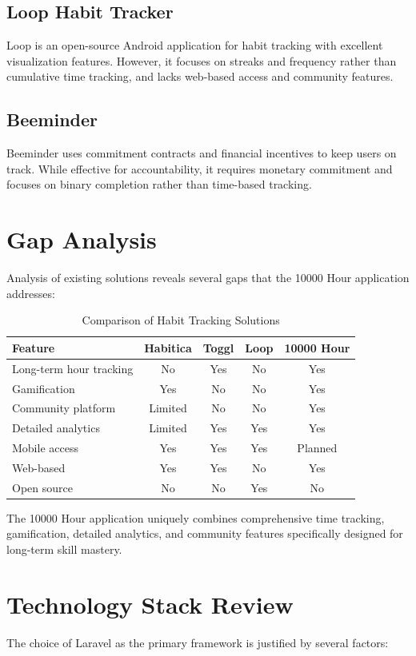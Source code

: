 \documentclass[12pt,a4paper]{report}
\newcommand{\JustifiedNormal}{\fontsize{12}{14}\selectfont\justifying\setlength{\parindent}{0pt}}
\begin{document}
\subsection{Loop Habit Tracker}
\JustifiedNormal
Loop is an open-source Android application for habit tracking with excellent visualization features. However, it focuses on streaks and frequency rather than cumulative time tracking, and lacks web-based access and community features.

\subsection{Beeminder}
\JustifiedNormal
Beeminder uses commitment contracts and financial incentives to keep users on track. While effective for accountability, it requires monetary commitment and focuses on binary completion rather than time-based tracking.

\section{Gap Analysis}
\JustifiedNormal
Analysis of existing solutions reveals several gaps that the 10000 Hour application addresses:

\begin{table}[H]
\centering
\caption{Comparison of Habit Tracking Solutions}
\begin{tabular}{|l|c|c|c|c|}
\hline
\textbf{Feature} & \textbf{Habitica} & \textbf{Toggl} & \textbf{Loop} & \textbf{10000 Hour} \\
\hline
Long-term hour tracking & No & Yes & No & Yes \\
Gamification & Yes & No & No & Yes \\
Community platform & Limited & No & No & Yes \\
Detailed analytics & Limited & Yes & Yes & Yes \\
Mobile access & Yes & Yes & Yes & Planned \\
Web-based & Yes & Yes & No & Yes \\
Open source & No & No & Yes & No \\
\hline
\end{tabular}
\end{table}

The 10000 Hour application uniquely combines comprehensive time tracking, gamification, detailed analytics, and community features specifically designed for long-term skill mastery.

\section{Technology Stack Review}
\JustifiedNormal
The choice of Laravel as the primary framework is justified by several factors:
\end{document}
